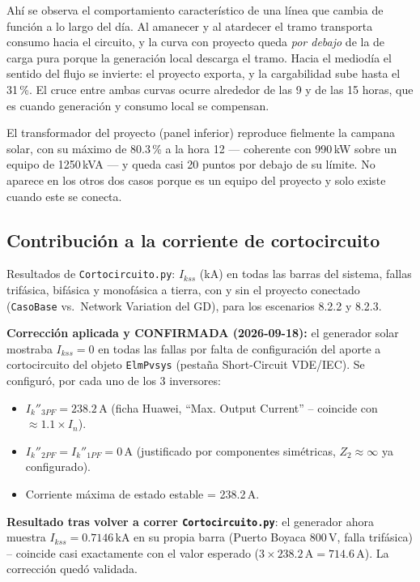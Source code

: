 \documentclass[11pt,a4paper]{article}
\begin{document}
Ah\'i se observa el comportamiento caracter\'istico de una l\'inea que cambia de funci\'on a lo largo del d\'ia. Al amanecer y al atardecer el tramo transporta consumo hacia el circuito, y la curva con proyecto queda \emph{por debajo} de la de carga pura porque la generaci\'on local descarga el tramo. Hacia el mediod\'ia el sentido del flujo se invierte: el proyecto exporta, y la cargabilidad sube hasta el 31\,\%. El cruce entre ambas curvas ocurre alrededor de las 9 y de las 15 horas, que es cuando generaci\'on y consumo local se compensan.

El transformador del proyecto (panel inferior) reproduce fielmente la campana solar, con su m\'aximo de 80.3\,\% a la hora 12 --- coherente con 990\,kW sobre un equipo de 1250\,kVA --- y queda casi 20 puntos por debajo de su l\'imite. No aparece en los otros dos casos porque es un equipo del proyecto y solo existe cuando este se conecta.

\subsection{Contribuci\'on a la corriente de cortocircuito}
\label{sec:cortocircuito}
Resultados de \texttt{Cortocircuito.py}: $I_{kss}$ (kA) en todas las barras del sistema, fallas trif\'asica, bif\'asica y monof\'asica a tierra, con y sin el proyecto conectado (\texttt{CasoBase} vs.\ Network Variation del GD), para los escenarios 8.2.2 y 8.2.3.

\textbf{Correcci\'on aplicada y CONFIRMADA (2026-09-18):} el generador solar mostraba $I_{kss}=0$ en todas las fallas por falta de configuraci\'on del aporte a cortocircuito del objeto \texttt{ElmPvsys} (pesta\~na Short-Circuit VDE/IEC). Se configur\'o, por cada uno de los 3 inversores:
\begin{itemize}
    \item $I_k''{}_{3PF} = 238.2$\,A (ficha Huawei, ``Max. Output Current'' -- coincide con $\approx1.1\times I_n$).
    \item $I_k''{}_{2PF} = I_k''{}_{1PF} = 0$\,A (justificado por componentes sim\'etricas, $Z_2\approx\infty$ ya configurado).
    \item Corriente m\'axima de estado estable = 238.2\,A.
\end{itemize}
\textbf{Resultado tras volver a correr \texttt{Cortocircuito.py}}: el generador ahora muestra $I_{kss}=0.7146$\,kA en su propia barra (Puerto Boyaca 800\,V, falla trif\'asica) -- coincide casi exactamente con el valor esperado ($3\times238.2\,\text{A}=714.6\,\text{A}$). La correcci\'on qued\'o validada.
\end{document}
